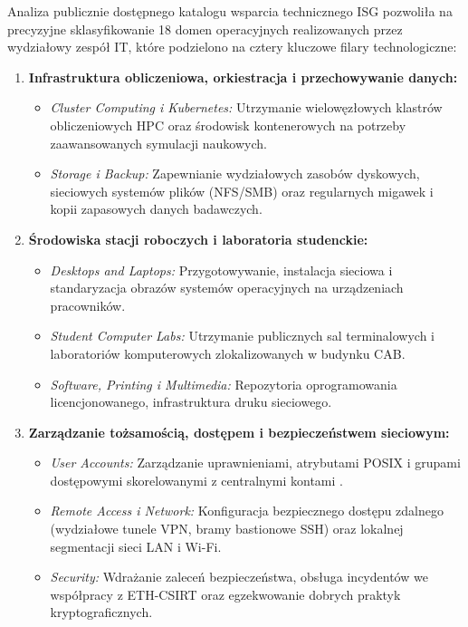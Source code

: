 
Analiza publicznie dostępnego katalogu wsparcia technicznego ISG pozwoliła na precyzyjne sklasyfikowanie 18 domen operacyjnych realizowanych przez wydziałowy zespół IT, które podzielono na cztery kluczowe filary technologiczne:
\begin{enumerate}
    \item \textbf{Infrastruktura obliczeniowa, orkiestracja i przechowywanie danych:}
    \begin{itemize}
        \item \textit{Cluster Computing i Kubernetes:} Utrzymanie wielowęzłowych klastrów obliczeniowych HPC oraz środowisk kontenerowych na potrzeby zaawansowanych symulacji naukowych.
        \item \textit{Storage i Backup:} Zapewnianie wydziałowych zasobów dyskowych, sieciowych systemów plików (NFS/SMB) oraz regularnych migawek i kopii zapasowych danych badawczych.
    \end{itemize}
    \item \textbf{Środowiska stacji roboczych i laboratoria studenckie:}
    \begin{itemize}
        \item \textit{Desktops and Laptops:} Przygotowywanie, instalacja sieciowa i standaryzacja obrazów systemów operacyjnych na urządzeniach pracowników.
        \item \textit{Student Computer Labs:} Utrzymanie publicznych sal terminalowych i laboratoriów komputerowych zlokalizowanych w budynku CAB.
        \item \textit{Software, Printing i Multimedia:} Repozytoria oprogramowania licencjonowanego, infrastruktura druku sieciowego.
    \end{itemize}
    \item \textbf{Zarządzanie tożsamością, dostępem i bezpieczeństwem sieciowym:}
    \begin{itemize}
        \item \textit{User Accounts:} Zarządzanie uprawnieniami, atrybutami POSIX i grupami dostępowymi skorelowanymi z centralnymi kontami .
        \item \textit{Remote Access i Network:} Konfiguracja bezpiecznego dostępu zdalnego (wydziałowe tunele VPN, bramy bastionowe SSH) oraz lokalnej segmentacji sieci LAN i Wi-Fi.
        \item \textit{Security:} Wdrażanie zaleceń bezpieczeństwa, obsługa incydentów we współpracy z ETH-CSIRT oraz egzekwowanie dobrych praktyk kryptograficznych.

\end{itemize}
\end{enumerate}
